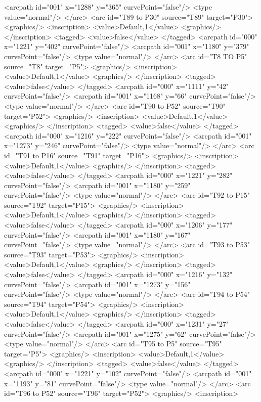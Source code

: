 <arcpath id="001" x="1288" y="365" curvePoint="false"/>
<type value="normal"/>
</arc>
<arc id="T89 to P30" source="T89" target="P30">
<graphics/>
<inscription>
<value>Default,1</value>
<graphics/>
</inscription>
<tagged>
<value>false</value>
</tagged>
<arcpath id="000" x="1221" y="402" curvePoint="false"/>
<arcpath id="001" x="1180" y="379" curvePoint="false"/>
<type value="normal"/>
</arc>
<arc id="T8 TO P5" source="T8" target="P5">
<graphics/>
<inscription>
<value>Default,1</value>
<graphics/>
</inscription>
<tagged>
<value>false</value>
</tagged>
<arcpath id="000" x="1111" y="42" curvePoint="false"/>
<arcpath id="001" x="1168" y="66" curvePoint="false"/>
<type value="normal"/>
</arc>
<arc id="T90 to P52" source="T90" target="P52">
<graphics/>
<inscription>
<value>Default,1</value>
<graphics/>
</inscription>
<tagged>
<value>false</value>
</tagged>
<arcpath id="000" x="1216" y="222" curvePoint="false"/>
<arcpath id="001" x="1273" y="246" curvePoint="false"/>
<type value="normal"/>
</arc>
<arc id="T91 to P16" source="T91" target="P16">
<graphics/>
<inscription>
<value>Default,1</value>
<graphics/>
</inscription>
<tagged>
<value>false</value>
</tagged>
<arcpath id="000" x="1221" y="282" curvePoint="false"/>
<arcpath id="001" x="1180" y="259" curvePoint="false"/>
<type value="normal"/>
</arc>
<arc id="T92 to P15" source="T92" target="P15">
<graphics/>
<inscription>
<value>Default,1</value>
<graphics/>
</inscription>
<tagged>
<value>false</value>
</tagged>
<arcpath id="000" x="1206" y="177" curvePoint="false"/>
<arcpath id="001" x="1180" y="167" curvePoint="false"/>
<type value="normal"/>
</arc>
<arc id="T93 to P53" source="T93" target="P53">
<graphics/>
<inscription>
<value>Default,1</value>
<graphics/>
</inscription>
<tagged>
<value>false</value>
</tagged>
<arcpath id="000" x="1216" y="132" curvePoint="false"/>
<arcpath id="001" x="1273" y="156" curvePoint="false"/>
<type value="normal"/>
</arc>
<arc id="T94 to P54" source="T94" target="P54">
<graphics/>
<inscription>
<value>Default,1</value>
<graphics/>
</inscription>
<tagged>
<value>false</value>
</tagged>
<arcpath id="000" x="1231" y="27" curvePoint="false"/>
<arcpath id="001" x="1275" y="62" curvePoint="false"/>
<type value="normal"/>
</arc>
<arc id="T95 to P5" source="T95" target="P5">
<graphics/>
<inscription>
<value>Default,1</value>
<graphics/>
</inscription>
<tagged>
<value>false</value>
</tagged>
<arcpath id="000" x="1221" y="102" curvePoint="false"/>
<arcpath id="001" x="1193" y="81" curvePoint="false"/>
<type value="normal"/>
</arc>
<arc id="T96 to P52" source="T96" target="P52">
<graphics/>
<inscription>
